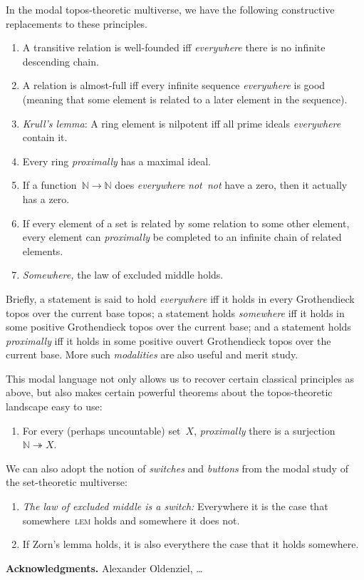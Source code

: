 \documentclass[oneside]{amsart}
\theoremstyle{definition}
\theoremstyle{plain}
\theoremstyle{remark}
\newcommand{\NN}{\mathbb{N}}
\renewcommand{\_}{\mathpunct{.}\,}
\newcommand{\notnot}{\emph{not~not}\xspace}
\begin{document}
In the modal topos-theoretic multiverse, we have the following constructive
replacements to these principles.
\begin{enumerate}
\item A transitive relation is well-founded iff \emph{everywhere} there is no infinite descending
chain.
\item A relation is almost-full iff every infinite sequence \emph{everywhere} is good (meaning
that some element is related to a later element in the sequence).
\item \emph{Krull's lemma}: A ring element is nilpotent iff all prime
ideals \emph{everywhere} contain it.
\item Every ring \emph{proximally} has a maximal ideal.
\item If a function~$\NN \to \NN$ does \emph{everywhere} \notnot have
a zero, then it actually has a zero.
\item If every element of a set is related by some relation to some other
element, every element can \emph{proximally} be completed to an infinite chain
of related elements.
\item \emph{Somewhere,} the law of excluded middle holds.
\end{enumerate}

Briefly, a statement is said to hold \emph{everywhere} iff it holds in every
Grothendieck topos over the current base topos; a statement holds
\emph{somewhere} iff it holds in some positive Grothendieck topos over the
current base; and a statement holds \emph{proximally} iff it holds in some
positive ouvert Grothendieck topos over the current base. More such
\emph{modalities} are also useful and merit study.

This modal language not only allows us to recover certain classical principles
as above, but also makes certain powerful theorems about the topos-theoretic
landscape easy to use:
\begin{enumerate}
\addtocounter{enumi}{7}
\item For every (perhaps uncountable) set~$X$, \emph{proximally} there is a
surjection~$\NN \twoheadrightarrow X$.
\end{enumerate}
We can also adopt the notion of \emph{switches} and \emph{buttons} from the
modal study of the set-theoretic multiverse:
\begin{enumerate}
\addtocounter{enumi}{8}
\item \emph{The law of excluded middle is a switch:} Everywhere it is the case
that somewhere~\textsc{lem} holds and somewhere it does not.
\item If Zorn's lemma holds, it is also everythere the case that it holds
somewhere.
\end{enumerate}

\textbf{Acknowledgments.} Alexander Oldenziel, \ldots
\end{document}
